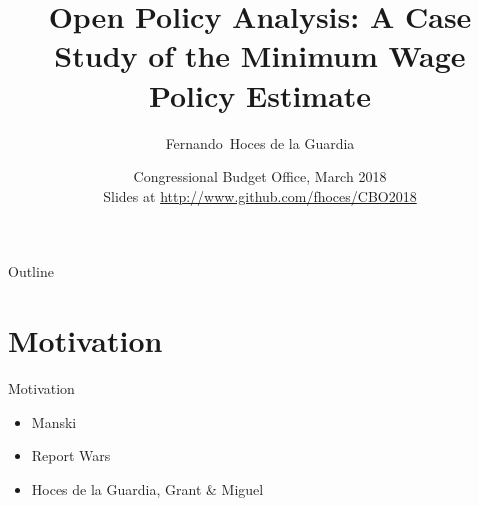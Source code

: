 \documentclass{beamer}
\title[OPA - Minimum Wage ] %
{Open Policy Analysis: A Case Study of the Minimum Wage Policy Estimate}
\subtitle
{}
\author[] %
{Fernando~Hoces de la Guardia\inst{1}}
\institute[Universities of Somewhere and Elsewhere] %
{
  \inst{1}%
  UC Berkeley:\\
  Berkeley Initiative for Transparency in the Social Sciences\\
}
\date[] %
{Congressional Budget Office, March 2018\\
{\small Slides at} \url{http://www.github.com/fhoces/CBO2018}}
\begin{document}
\begin{frame}
  \titlepage
\end{frame}

\begin{frame}{Outline}
  \tableofcontents
\end{frame}
 
\section{Motivation}

\begin{frame}{Motivation}
\begin{itemize}
\item Manski
\item Report Wars
\item Hoces de la Guardia, Grant \& Miguel
\end{itemize}
\end{frame}
 
\end{document}
